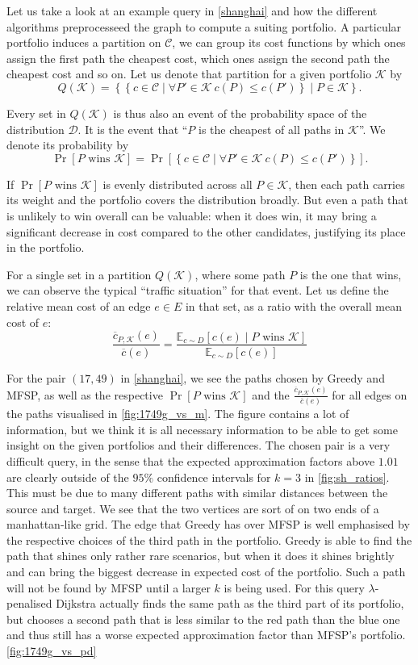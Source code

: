 Let us take a look at an example query in \cref{shanghai} and how the different algorithms preprocesseed the graph to compute a suiting portfolio. A particular portfolio induces a partition on $\mathcal C$, we can group its cost functions by which ones assign the first path the cheapest cost, which ones assign the second path the cheapest cost and so on. Let us denote that partition for a given portfolio $\mathcal K$ by
\[
Q(\mathcal K) = \left\{\left\{ c\in\mathcal C\mid \forall P'\in\mathcal K\ c(P) \le c(P')\right\} \mid P \in \mathcal K\right\}.
\]

Every set in $Q(\mathcal K)$ is thus also an event of the probability space of the distribution $\mathcal D$. It is the event that ``$P$ is the cheapest of all paths in $\mathcal K$''. We denote its probability by
\[
\Pr[P\text{ wins }\mathcal K] = \Pr\left[\left\{ c\in\mathcal C\mid \forall P'\in\mathcal K\ c(P) \le c(P')\right\}\right].
\]

If $\Pr[P\text{ wins }\mathcal K]$ is evenly distributed across all $P\in\mathcal K$, then each path carries its weight and the portfolio covers the distribution broadly. But even a path that is unlikely to win overall can be valuable: when it does win, it may bring a significant decrease in cost compared to the other candidates, justifying its place in the portfolio.

For a single set in a partition $Q(\mathcal K)$, where some path $P$ is the one that wins, we can observe the typical ``traffic situation'' for that event. Let us define the relative mean cost of an edge $e\in E$ in that set, as a ratio with the overall mean cost of $e$:
\[
\frac{\overline c_{P,\mathcal K}(e)}{\overline c(e)} = \frac{\mathbb E_{c\sim D}[c(e) \mid P\text{ wins }\mathcal K]}{\mathbb E_{c\sim D}[c(e)]}
\]

For the pair $(17,49)$ in \cref{shanghai}, we see the paths chosen by Greedy and MFSP, as well as the respective $\Pr[P\text{ wins }\mathcal K]$ and the $\frac{\overline c_{P,\mathcal K}(e)}{\overline c(e)}$ for all edges on the paths visualised in \cref{fig:1749g_vs_m}. The figure contains a lot of information, but we think it is all necessary information to be able to get some insight on the given portfolios and their differences. 
The chosen pair is a very difficult query, in the sense that the expected approximation factors above $1.01$ are clearly outside of the $95\%$ confidence intervals for $k=3$ in \cref{fig:sh_ratios}. This must be due to many different paths with similar distances between the source and target. We see that the two vertices are sort of on two ends of a manhattan-like grid.
The edge that Greedy has over MFSP is well emphasised by the respective choices of the third path in the portfolio. Greedy is able to find the path that shines only rather rare scenarios, but when it does it shines brightly and can bring the biggest decrease in expected cost of the portfolio. Such a path will not be found by MFSP until a larger $k$ is being used.
For this query $\lambda$-penalised Dijkstra actually finds the same path as the third part of its portfolio, but chooses a second path that is less similar to the red path than the blue one and thus still has a worse expected approximation factor than MFSP's portfolio. \cref{fig:1749g_vs_pd}


